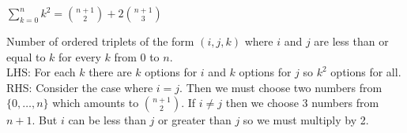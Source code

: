 \question $\sum\limits_{k = 0}^{n} k^2 = \binom{n + 1}{2} + 2\binom{n + 1}{3}$ \\

\begin{solution}[2 cm]
Number of ordered triplets of the form $(i, j, k)$ where $i$ and $j$ 
are less than or equal to $k$ for every $k$ from 0 to $n$. \\
LHS: For each $k$ there are $k$ options for $i$ and $k$ options for 
$j$ so $k^2$ options for all. \\
RHS: Consider the case where $i = j$. Then we must choose two numbers 
from $\{0, \ldots, n\}$ which amounts to $\binom{n + 1}{2}$. 
If $i \neq j$ then we choose 3 numbers from $n + 1$. But $i$ can be 
less than $j$ or greater than $j$ so we must multiply by 2.
\end{solution}